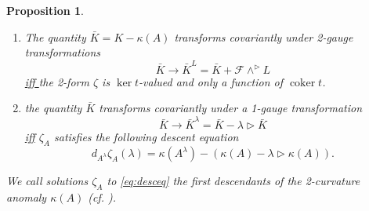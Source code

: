 \documentclass[onecolumn]{article}
\theoremstyle{theorem}
\newtheorem{proposition}{Proposition}[section]
\theoremstyle{remark}
\theoremstyle{example}
\theoremstyle{definition}
\numberwithin{equation}{section}
\begin{document}
\begin{proposition}~
    \begin{enumerate}
        \item The quantity $\bar K = K-\kappa(A)$ transforms covariantly under 2-gauge transformations 
        \begin{equation*}
            \bar K \rightarrow \bar K^L = \bar K + \mathcal{F}\wedge^\rhd L
        \end{equation*}
        \underline{{iff} %
} the 2-form $\zeta$ is $\operatorname{ker}t$-valued and only a function of $\operatorname{coker}t$.
        \item the quantity $\bar K$ transforms covariantly under a 1-gauge transformation
        \begin{equation*}
            \bar K \rightarrow \bar K^\lambda = \bar K-\lambda\rhd \bar K
        \end{equation*}
        \underline{{iff}} $\zeta_A$ satisfies the following descent equation
    \begin{equation}
        d_{A^\lambda}\zeta_A(\lambda) = \kappa(A^\lambda) - (\kappa(A) -\lambda\rhd\kappa(A)).\label{eq:desceq}
    \end{equation}
    \end{enumerate}
    {We} call solutions $\zeta_A$ to \eqref{eq:desceq} the {{first descendants}} of the 2-curvature anomaly $\kappa(A)$ (cf. \cite{Kapustin:2013uxa}).
\end{proposition}
\end{document}
